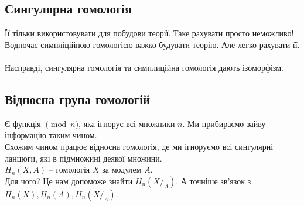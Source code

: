 \documentclass[a4paper, 10pt]{article}
\theoremstyle{theoremdd}
\theoremstyle{theoremdd}
\theoremstyle{theoremdd}
\theoremstyle{theoremdd}
\theoremstyle{theoremdd}
\theoremstyle{theoremdd}
\theoremstyle{theoremdd}
\theoremstyle{theoremdd}
\theoremstyle{theoremdd}
\theoremstyle{theoremdd}
\theoremstyle{theoremdd}
\theoremstyle{theoremdd}
\theoremstyle{theoremdd}
\theoremstyle{theoremdd}
\theoremstyle{theoremdd}
\begin{document}
\subsection{Сингулярна гомологія}
Її тільки використовувати для побудови теорії. Таке рахувати просто неможливо!\\
Водночас симпліційною гомологією важко будувати теорію. Але легко рахувати її.\\
\bigskip \\
Насправді, сингулярна гомологія та симплиційна гомологія дають ізоморфізм.

\subsection{Відносна група гомологій}
Є функція $\pmod n$, яка ігнорує всі множники $n$. Ми прибираємо зайву інформацію таким чином.\\
Схожим чином працює відносна гомологія, де ми ігноруємо всі сингулярні ланцюги, які в підмножині деякої множини.\\
$H_n(X,A)$ -- гомологія $X$ за модулем $A$.
\bigskip \\
Для чого? Це нам допоможе знайти $H_n(X/_A)$. А точніше зв'язок з $H_n(X),H_n(A),H_n(X/_A)$.
\end{document}
